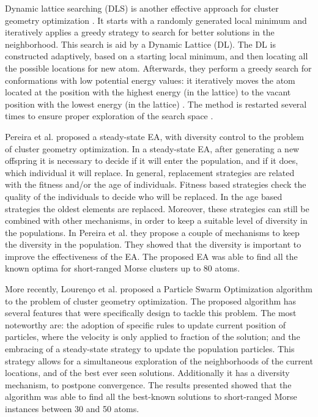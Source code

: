 		Dynamic lattice searching (DLS) is another effective approach for cluster geometry optimization \cite{cheng07}. It starts with a randomly generated local minimum and iteratively applies a greedy strategy to search for better solutions in the neighborhood. This search is aid by a Dynamic Lattice (DL). The DL is constructed adaptively, based on a starting local minimum, and then locating all the possible locations for new atom. Afterwards, they perform a greedy search for conformations with low potential energy values: it iteratively moves the atom located at the position with the highest energy (in the lattice) to the vacant position with the lowest energy (in the lattice) \cite{cheng07, shao04}. The method is restarted several times to ensure proper exploration of the search space \cite{cheng07}.
			
		Pereira et al.\cite{xico09} proposed a steady-state EA, with diversity control to the problem of cluster geometry optimization. In a steady-state EA, after generating a new offspring it is necessary to decide if it will enter the population, and if it does, which individual it will replace. In general, replacement strategies are related with the fitness and/or the age of individuals. Fitness based strategies check the quality of the individuals to decide who will be replaced. In the age based strategies the oldest elements are replaced. Moreover, these strategies can still be combined with other mechanisms, in order to keep a suitable level of diversity in the populations.
		In Pereira et al.\cite{xico09} they propose a couple of mechanisms to keep the diversity in the population. They showed that the diversity is important to improve the effectiveness of the EA. The proposed EA was able to find all the known optima for short-ranged Morse clusters up to 80 atoms.
		
		More recently, Lourenço et al. \cite{lourenco11} proposed a Particle Swarm Optimization algorithm to the problem of cluster geometry optimization. The proposed algorithm has several features that were specifically design to tackle this problem. The most noteworthy are: the adoption of specific rules to update current position of particles, where the velocity is only applied to fraction of the solution; and the embracing of a steady-state strategy to update the population particles. This strategy allows for a simultaneous exploration of the neighborhoods of the current locations, and of the best ever seen solutions. Additionally it has a diversity mechanism, to postpone convergence.
 		The results presented showed that the algorithm was able to find all the best-known solutions to short-ranged Morse instances between 30 and 50 atoms.

		
